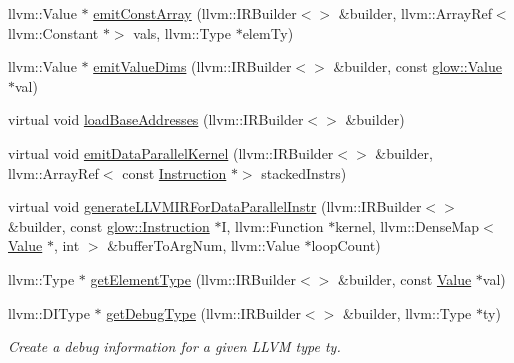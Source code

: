\begin{DoxyCompactItemize}
\item 
llvm\+::\+Value $\ast$ \hyperlink{classglow_1_1_l_l_v_m_i_r_gen_ab48cd5bfd5d480f9f3d29b399132b8a5}{emit\+Const\+Array} (llvm\+::\+I\+R\+Builder$<$$>$ \&builder, llvm\+::\+Array\+Ref$<$ llvm\+::\+Constant $\ast$$>$ vals, llvm\+::\+Type $\ast$elem\+Ty)
\item 
llvm\+::\+Value $\ast$ \hyperlink{classglow_1_1_l_l_v_m_i_r_gen_a48f4e8b52d60ed9688c2fbfbd233ee93}{emit\+Value\+Dims} (llvm\+::\+I\+R\+Builder$<$$>$ \&builder, const \hyperlink{classglow_1_1_value}{glow\+::\+Value} $\ast$val)
\item 
virtual void \hyperlink{classglow_1_1_l_l_v_m_i_r_gen_ac5f23be02496680d03496b598c653c49}{load\+Base\+Addresses} (llvm\+::\+I\+R\+Builder$<$$>$ \&builder)
\item 
virtual void \hyperlink{classglow_1_1_l_l_v_m_i_r_gen_ae8c55abb7ab22bd32aee5d3472606475}{emit\+Data\+Parallel\+Kernel} (llvm\+::\+I\+R\+Builder$<$$>$ \&builder, llvm\+::\+Array\+Ref$<$ const \hyperlink{classglow_1_1_instruction}{Instruction} $\ast$$>$ stacked\+Instrs)
\item 
virtual void \hyperlink{classglow_1_1_l_l_v_m_i_r_gen_a638e1a6f88ef525a57fa03c7c0cae7cc}{generate\+L\+L\+V\+M\+I\+R\+For\+Data\+Parallel\+Instr} (llvm\+::\+I\+R\+Builder$<$$>$ \&builder, const \hyperlink{classglow_1_1_instruction}{glow\+::\+Instruction} $\ast$I, llvm\+::\+Function $\ast$kernel, llvm\+::\+Dense\+Map$<$ \hyperlink{classglow_1_1_value}{Value} $\ast$, int $>$ \&buffer\+To\+Arg\+Num, llvm\+::\+Value $\ast$loop\+Count)
\item 
llvm\+::\+Type $\ast$ \hyperlink{classglow_1_1_l_l_v_m_i_r_gen_a4632479e0de5211cbb0131c232e9b014}{get\+Element\+Type} (llvm\+::\+I\+R\+Builder$<$$>$ \&builder, const \hyperlink{classglow_1_1_value}{Value} $\ast$val)
\item 
\mbox{\label{classglow_1_1_l_l_v_m_i_r_gen_a6363384b6ce32e716b773fa5bb6e748d}} 
llvm\+::\+D\+I\+Type $\ast$ \hyperlink{classglow_1_1_l_l_v_m_i_r_gen_a6363384b6ce32e716b773fa5bb6e748d}{get\+Debug\+Type} (llvm\+::\+I\+R\+Builder$<$$>$ \&builder, llvm\+::\+Type $\ast$ty)
\begin{DoxyCompactList}\small\item\em Create a debug information for a given L\+L\+VM type {\ttfamily ty}. \end{DoxyCompactList}\item 
\mbox{\label{classglow_1_1_l_l_v_m_i_r_gen_a335637a14e9b5a71196b26eec696e000}} 
$$
\end{DoxyCompactItemize}

